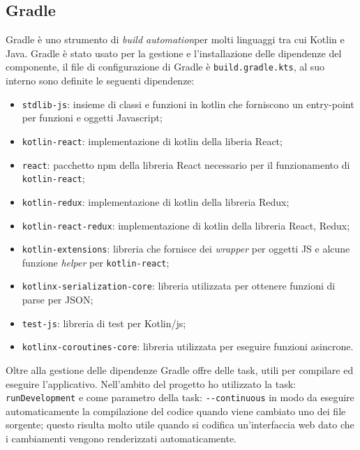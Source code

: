 \subsection{Gradle}
Gradle è uno strumento di \emph{build automation}\glosp per molti linguaggi tra cui Kotlin e Java. Gradle è stato usato per la gestione e l'installazione delle dipendenze del componente, il file di configurazione di Gradle è \verb|build.gradle.kts|, al suo interno sono definite le seguenti dipendenze:
\begin{itemize}
	\item \verb|stdlib-js|: insieme di classi e funzioni in kotlin che forniscono un entry-point per funzioni e oggetti Javascript;
	
	\item \verb|kotlin-react|: implementazione di kotlin della liberia React;
	
	\item \verb|react|: pacchetto npm della libreria React necessario per il funzionamento di \verb|kotlin-react|;
	
	\item \verb|kotlin-redux|: implementazione di kotlin della libreria Redux;
	
	\item \verb|kotlin-react-redux|: implementazione di kotlin della libreria React, Redux;
	
	\item \verb|kotlin-extensions|: libreria che fornisce dei \emph{wrapper} per oggetti JS e alcune funzione \emph{helper} per \verb|kotlin-react|;
	
	\item \verb|kotlinx-serialization-core|: libreria utilizzata per ottenere funzioni di parse per JSON;
	
	\item \verb|test-js|: libreria di test per Kotlin/js;
	
	\item \verb|kotlinx-coroutines-core|: libreria utilizzata per eseguire funzioni asincrone.
\end{itemize}
\noindent
Oltre alla gestione delle dipendenze Gradle offre delle task, utili per compilare ed eseguire l'applicativo. Nell'ambito del progetto ho utilizzato la task: \verb|runDevelopment| e come parametro della task: \verb|--continuous| in modo da eseguire automaticamente la compilazione del codice quando viene cambiato uno dei file sorgente; questo risulta molto utile quando si codifica un'interfaccia web dato che i cambiamenti vengono renderizzati automaticamente.

